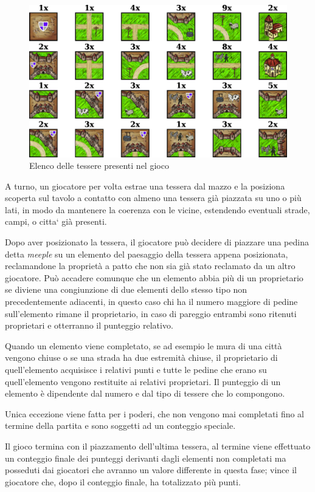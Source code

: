 \begin{figure}[H]
\centering
\includegraphics[width=\textwidth]{img/tiles.png}
\caption{Elenco delle tessere presenti nel gioco}
\label{img:tiles}
\end{figure}

A turno, un giocatore per volta estrae una tessera dal mazzo e la posiziona scoperta sul tavolo
a contatto con almeno una tessera già piazzata su uno o più lati, in modo da mantenere la coerenza con le vicine, 
estendendo eventuali strade, campi, o citta` già presenti.

Dopo aver posizionato la tessera, il giocatore può decidere di piazzare
una pedina detta \emph{meeple} su un elemento del paesaggio della tessera appena posizionata, reclamandone la proprietà a patto che non sia già stato reclamato da un altro giocatore.
Può accadere comunque che un elemento abbia più di un
proprietario se diviene una congiunzione di due elementi dello stesso
tipo non precedentemente adiacenti, in questo caso chi ha il numero maggiore di pedine sull'elemento rimane il proprietario, in caso di pareggio entrambi sono ritenuti proprietari e otterranno il punteggio relativo.

Quando un elemento viene completato, se ad esempio le mura di una città
vengono chiuse o se una strada ha due estremità chiuse, il proprietario
di quell'elemento acquisisce i relativi punti e tutte le pedine che erano su quell'elemento vengono restituite ai relativi proprietari. Il punteggio di un
elemento è dipendente dal numero e dal tipo di tessere che lo compongono.

Unica eccezione viene fatta per i poderi, che non vengono mai completati fino al termine della partita e sono soggetti ad un conteggio speciale.

Il gioco termina con il piazzamento dell'ultima tessera, al termine viene effettuato un conteggio finale dei punteggi derivanti dagli elementi non completati ma posseduti dai giocatori che avranno un valore differente in questa fase; vince il giocatore che, dopo il conteggio finale, ha totalizzato più punti.

